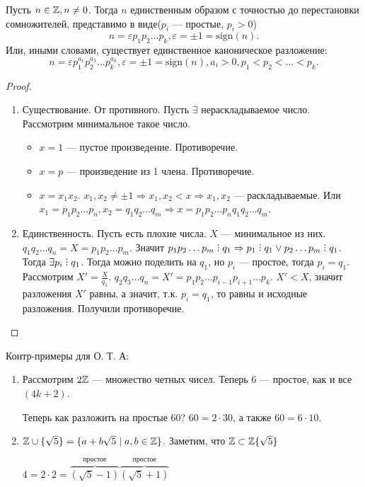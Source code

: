 \begin{theorem}
    Пусть $n \in \mathbb{Z}, n \neq 0$. Тогда  $n$ единственным образом с точностью до перестановки сомножителей, представимо в виде($p_i$ --- простые, $p_i > 0$)  \[
        n = \varepsilon p_1p_2\ldots p_k, \varepsilon = \pm 1 = \text{sign}(n)
    .\] 
    Или, иными словами, существует единственное каноническое разложение: \[
	    n = \varepsilon p_1 ^ {a_1} p_2 ^ {a_2} \ldots p_k ^ {a_k}, \varepsilon = \pm 1 = \text{sign}(n), a_i > 0, p_1 < p_2 < \ldots < p_k
    .\]
\end{theorem}
\begin{proof}
    \slashn
\begin{enumerate}
    \item Существование. От противного. Пусть $\exists$ нераскладываемое число. Рассмотрим минимальное такое число.
        \begin{itemize}
            \item $x = 1$ --- пустое произведение. Противоречие.
            \item  $x = p$ --- произведение из 1 члена. Противоречие.
            \item  $x = x_1x_2$. $x_1,x_2 \neq \pm 1 \Rightarrow x_1, x_2 < x \Rightarrow x_1, x_2$ --- раскладываемые. Или $x_1 = p_1 p_2\ldots p_n, x_2 = q_1 q_2 \ldots q_m \Rightarrow x = p_1 p_2 \ldots p_n q_1 q_2 \ldots q_m$.
        \end{itemize}
\item Единственность. Пусть есть плохие числа. $X$ --- минимальное из них.  $q_1 q_2 \ldots q_n = X = p_1 p_2 \ldots p_m$. Значит $p_1 p_2 \ldots p_m \divby q_1 \Rightarrow p_1 \divby q_1 \lor p_2\ldots p_m \divby q_1$. Тогда $\exists p_i \divby q_1$. Тогда можно поделить на  $q_1$, но $p_i$ --- простое, тогда  $p_i = q_1$. Рассмотрим  $X' = \frac{X}{q_1}$. $q_2 q_3 \ldots q_n = X' = p_1 p_2 \ldots p_{i-1} p_{i+1} \ldots p_k$. $X' < X$, значит разложения $X'$ равны, а значит, т.к. $p_i = q_1$, то равны и исходные разложения. Получили противоречие. 
\end{enumerate}
\end{proof}
Контр-примеры для О. Т. А:
\begin{enumerate}
    \item Рассмотрим $2\mathbb{Z}$ --- множество четных чисел. Теперь 6 --- простое, как и все $(4k + 2)$.

        Теперь как разложить на простые 60?  $60 = 2 \cdot 30$, а также  $60 = 6 \cdot 10$.
    \item $\mathbb{Z} \cup \{\sqrt{5}\} = \{ a + b\sqrt{5} \mid a,b \in \mathbb{Z}\}$. Заметим, что  $\mathbb{Z} \subset \mathbb{Z}\{\sqrt{5}\}$

        $4 = 2 \cdot 2 = \overbrace{(\sqrt{5} - 1)}^{\text{простое}}\overbrace{(\sqrt{5} + 1)}^{\text{простое}}$
\end{enumerate}
